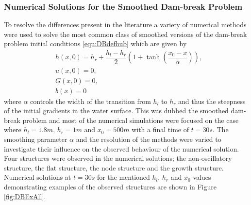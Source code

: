 \subsubsection{Numerical Solutions for the Smoothed Dam-break Problem}
To resolve the differences present in the literature a variety of numerical methods were used to solve the most common class of smoothed versions of the dam-break problem initial conditions \eqref{eqn:DBdefhub} which are given by
	\begin{align*}
	&h(x,0) = h_r + \dfrac{h_l - h_r}{2} \left(1 +  \tanh\left(\dfrac{x_0 - x}{\alpha}\right) \right), \\
	&u(x,0) = 0 , \\
	&G(x,0) = 0 , \\
	&b(x) = 0
	\end{align*}
where $\alpha$ controls the width of the transition from $h_l$ to $h_r$ and thus the steepness of the initial gradients in the water surface. This was dubbed the smoothed dam-break problem and most of the numerical simulations were focused on the case where $h_l = 1.8m$, $h_r = 1m$ and $x_0 = 500m$ with a final time of $t=30s$. The smoothing parameter $\alpha$ and the resolution of the methods were varied to investigate their influence on the observed behaviour of the numerical solution. Four structures were observed in the numerical solutions; the non-oscillatory structure, the flat structure, the node structure and the growth structure. Numerical solutions at $t=30s$ for the mentioned $h_l$, $h_r$ and $x_0$ values demonstrating examples of the observed structures are shown in Figure \ref{fig:DBExAll}. 
